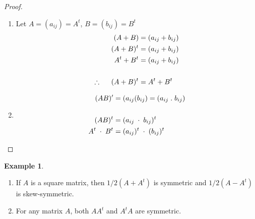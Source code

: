 \documentclass[11pt,a4paper]{article}
\theoremstyle{definition}
\newtheorem{exa}[thm]{Example}
\begin{document}
\begin{proof}
\begin{enumerate}
\item Let $A=(a_{ij})=A^t$, $B=(b_{ij})=B^t$
\begin{align*}
(A+B) &=(a_{ij}+b_{ij})\\
(A+B)^t &=(a_{ij}+b_{ij})\\
A^t+B^t &=(a_{ij}+b_{ij})\\\\
\therefore \hspace{0.5cm} (A+B)^t &=A^t+B^t\\
\end{align*}

\item
\begin{align*}
(AB)' &=(a_{ij}(b_{ij})=(a_{ij}\hspace{0.1cm}.\hspace{0.1cm}b_{ij})\\\\
(AB)^t &=(a_{ij}\hspace{0.1cm}\cdot\hspace{0.1cm}b_{ij})^t\\
A^t\hspace{0.1cm}\cdot\hspace{0.1cm}B^t &=(a_{ij})^t\hspace{0.1cm}\cdot\hspace{0.1cm}(b_{ij})^t\\
\end{align*}
\end{enumerate}
\end{proof}


\begin{exa}
\begin{enumerate}
\item If $A$ is a square matrix, then $1/2(A+A^t)$ is symmetric and $1/2(A-A^t)$ is skew-symmetric.
\item For any matrix $A$, both $AA^t$ and $A^tA$ are symmetric.
\end{enumerate}
\end{exa}
\end{document}
